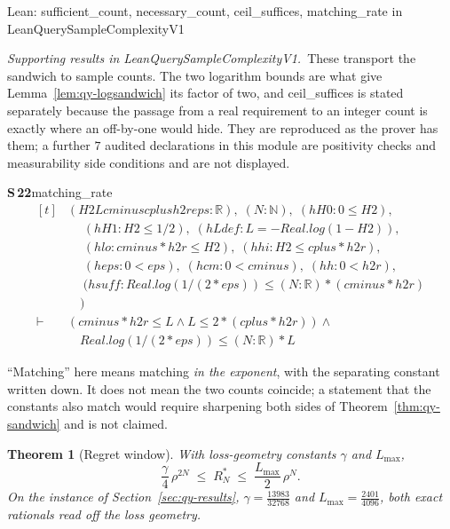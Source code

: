 \documentclass[conference]{IEEEtran}
\newtheorem{theorem}{Theorem}
\theoremstyle{definition}
\newcommand{\lean}[1]{\textsf{\footnotesize #1}}
\newcommand{\leanbox}[1]{%
  \par\vspace{2pt}\noindent
  {\footnotesize\textsf{Lean: #1}}\par\vspace{2pt}}
\begin{document}
\leanbox{\lean{sufficient\_count}, \lean{necessary\_count}, \lean{ceil\_suffices},
\lean{matching\_rate} in \lean{LeanQuerySampleComplexityV1}}

\noindent\emph{Supporting results in \lean{LeanQuerySampleComplexityV1}.}~These transport the sandwich to sample counts. The two logarithm bounds are what give Lemma~\ref{lem:qy-logsandwich} its factor of two, and \lean{ceil\_suffices} is stated separately because the passage from a real requirement to an integer count is exactly where an off-by-one would hide. They are reproduced as the prover has them; a further $7$ audited declarations in this module are positivity checks and measurability side conditions and are not displayed.

\noindent\textbf{S\,22}\quad\lean{matching\_rate}
{\footnotesize\[ \begin{aligned}[t]
&(\mathit{H2} \mathit{L} \mathit{cminus} \mathit{cplus} \mathit{h2r} \mathit{eps} : \mathbb{R} ),\; (\mathit{N} : \mathbb{N} ),\; (\mathit{hH0} : 0 \leq \mathit{H2}),\\
&\quad \; (\mathit{hH1} : \mathit{H2} \leq 1/2),\; (\mathit{hLdef} : \mathit{L} = -\mathit{Real}.\mathit{log} (1 - \mathit{H2})),\\
&\quad \; (\mathit{hlo} : \mathit{cminus} * \mathit{h2r} \leq \mathit{H2}),\; (\mathit{hhi} : \mathit{H2} \leq \mathit{cplus} * \mathit{h2r}),\\
&\quad \; (\mathit{heps} : 0 < \mathit{eps}),\; (\mathit{hcm} : 0 < \mathit{cminus}),\; (\mathit{hh} : 0 < \mathit{h2r}),\\
&\quad \; (\mathit{hsuff} : \mathit{Real}.\mathit{log} (1 / (2 * \mathit{eps})) \leq (\mathit{N} : \mathbb{R} ) * (\mathit{cminus} * \mathit{h2r})\\
&\quad )\\
\vdash\;&(\mathit{cminus} * \mathit{h2r} \leq \mathit{L} \wedge \mathit{L} \leq 2 * (\mathit{cplus} * \mathit{h2r})) \wedge\\
&\quad \mathit{Real}.\mathit{log} (1 / (2 * \mathit{eps})) \leq (\mathit{N} : \mathbb{R} ) * \mathit{L}
\end{aligned} \]}


``Matching'' here means matching \emph{in the exponent}, with the separating constant written
down. It does not mean the two counts coincide; a statement that the constants also match
would require sharpening both sides of Theorem~\ref{thm:qy-sandwich} and is not claimed.

\begin{theorem}[Regret window]
\label{thm:qy-regret}
With loss-geometry constants $\gamma$ and $L_{\max}$,
\begin{equation}
\frac{\gamma}{4}\,\rho^{2N}\;\leq\;R_{N}^{*}\;\leq\;\frac{L_{\max}}{2}\,\rho^{N}.
\label{eq:qy-regret}
\end{equation}
On the instance of Section~\ref{sec:qy-results}, $\gamma=\tfrac{13983}{32768}$ and
$L_{\max}=\tfrac{2401}{4096}$, both exact rationals read off the loss geometry.
\end{theorem}
\end{document}
